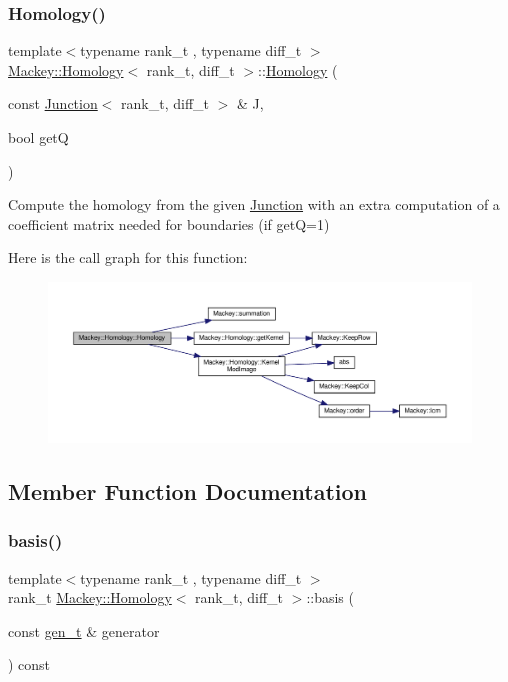 \subsubsection{\texorpdfstring{Homology()}{Homology()}\hspace{0.1cm}{\footnotesize\ttfamily [3/3]}}
{\footnotesize\ttfamily template$<$typename rank\+\_\+t , typename diff\+\_\+t $>$ \\
\hyperlink{classMackey_1_1Homology}{Mackey\+::\+Homology}$<$ rank\+\_\+t, diff\+\_\+t $>$\+::\hyperlink{classMackey_1_1Homology}{Homology} (\begin{DoxyParamCaption}\item[{const \hyperlink{classMackey_1_1Junction}{Junction}$<$ rank\+\_\+t, diff\+\_\+t $>$ \&}]{J,  }\item[{bool}]{getQ }\end{DoxyParamCaption})}



Compute the homology from the given \hyperlink{classMackey_1_1Junction}{Junction} with an extra computation of a coefficient matrix needed for boundaries (if getQ=1) 

Here is the call graph for this function\+:\nopagebreak
\begin{figure}[H]
\begin{center}
\leavevmode
\includegraphics[width=350pt]{classMackey_1_1Homology_af42f480509ef68df47308c0f506d44c8_cgraph}
\end{center}
\end{figure}


\subsection{Member Function Documentation}
\mbox{\label{classMackey_1_1Homology_a2e6fb6da3abdba934a1eb2f4236623cb}} 
\subsubsection{\texorpdfstring{basis()}{basis()}}
{\footnotesize\ttfamily template$<$typename rank\+\_\+t , typename diff\+\_\+t $>$ \\
rank\+\_\+t \hyperlink{classMackey_1_1Homology}{Mackey\+::\+Homology}$<$ rank\+\_\+t, diff\+\_\+t $>$\+::basis (\begin{DoxyParamCaption}\item[{const \hyperlink{classMackey_1_1Homology_a0f7541ee6181c75cb7efa41f3b63f0a5}{gen\+\_\+t} \&}]{generator }\end{DoxyParamCaption}) const}



